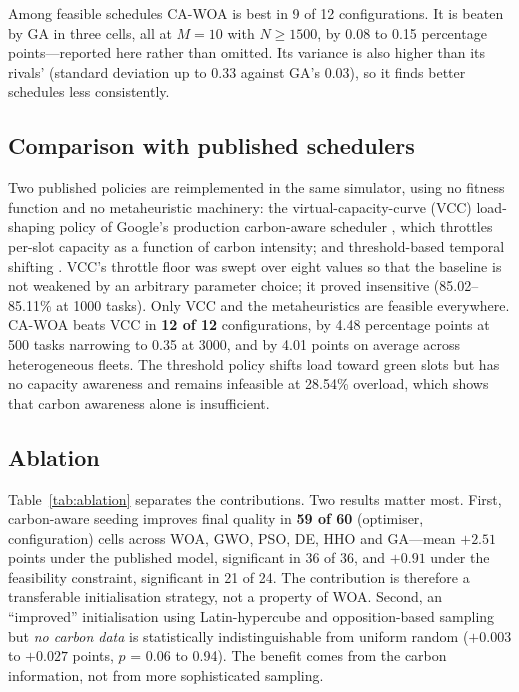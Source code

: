 \documentclass[12pt,a4paper]{article}
\begin{document}
Among feasible schedules CA-WOA is best in 9 of 12 configurations. It is beaten by GA in three cells, all at
$M=10$ with $N\ge1500$, by 0.08 to 0.15 percentage points---reported here rather than omitted. Its variance is
also higher than its rivals' (standard deviation up to 0.33 against GA's 0.03), so it finds better schedules
less consistently.

\subsection{Comparison with published schedulers}\label{sec:modern}
Two published policies are reimplemented in the same simulator, using no fitness function and no
metaheuristic machinery: the virtual-capacity-curve (VCC) load-shaping policy of Google's production
carbon-aware scheduler \cite{radovanovic2023carbon}, which throttles per-slot capacity as a function of carbon
intensity; and threshold-based temporal shifting \cite{wiesner2021lets}. VCC's throttle floor was swept over
eight values so that the baseline is not weakened by an arbitrary parameter choice; it proved insensitive
(85.02--85.11\% at 1000 tasks). Only VCC and the metaheuristics are feasible everywhere. CA-WOA beats VCC in
\textbf{12 of 12} configurations, by 4.48 percentage points at 500 tasks narrowing to 0.35 at 3000, and by
4.01 points on average across heterogeneous fleets. The threshold policy shifts load toward green slots but
has no capacity awareness and remains infeasible at 28.54\% overload, which shows that carbon awareness alone
is insufficient.

\subsection{Ablation}\label{sec:ablation}
Table~\ref{tab:ablation} separates the contributions. Two results matter most. First, carbon-aware seeding
improves final quality in \textbf{59 of 60} (optimiser, configuration) cells across WOA, GWO, PSO, DE, HHO and
GA---mean $+2.51$ points under the published model, significant in 36 of 36, and $+0.91$ under the feasibility
constraint, significant in 21 of 24. The contribution is therefore a transferable initialisation strategy, not
a property of WOA. Second, an ``improved'' initialisation using Latin-hypercube and opposition-based sampling
but \emph{no carbon data} is statistically indistinguishable from uniform random ($+0.003$ to $+0.027$ points,
$p$ = 0.06 to 0.94). The benefit comes from the carbon information, not from more sophisticated sampling.
\end{document}
